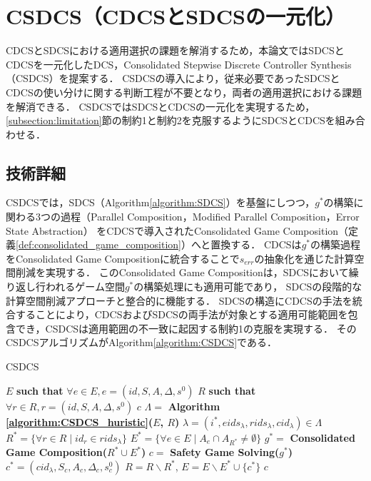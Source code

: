 \section{CSDCS（CDCSとSDCSの一元化）}
\label{section:proposal}
CDCSとSDCSにおける適用選択の課題を解消するため，本論文ではSDCSとCDCSを一元化したDCS，Consolidated Stepwise Discrete Controller Synthesis（CSDCS）を提案する．
CSDCSの導入により，従来必要であったSDCSとCDCSの使い分けに関する判断工程が不要となり，両者の適用選択における課題を解消できる．
CSDCSではSDCSとCDCSの一元化を実現するため，\ref{subsection:limitation}節の制約1と制約2を克服するようにSDCSとCDCSを組み合わせる．

\subsection{技術詳細}
CSDCSでは，SDCS（Algorithm\ref{algorithm:SDCS}）を基盤にしつつ，$g^{*}$の構築に関わる3つの過程（Parallel Composition，Modified Parallel Composition，Error State Abstraction）
をCDCSで導入されたConsolidated Game Composition（定義\ref{def:consolidated_game_composition}）へと置換する．
CDCSは$g^{*}$の構築過程をConsolidated Game Compositionに統合することで$s_{err}$の抽象化を通じた計算空間削減を実現する．
このConsolidated Game Compositionは，SDCSにおいて繰り返し行われるゲーム空間$g^{*}$の構築処理にも適用可能であり，
SDCSの段階的な計算空間削減アプローチと整合的に機能する．
SDCSの構造にCDCSの手法を統合することにより，CDCSおよびSDCSの両手法が対象とする適用可能範囲を包含でき，CSDCSは適用範囲の不一致に起因する制約1の克服を実現する．
そのCSDCSアルゴリズムがAlgorithm\ref{algorithm:CSDCS}である．

\begin{algorithm}[h]
\caption{CSDCS}
\label{algorithm:CSDCS}
\begin{algorithmic}[1]
\renewcommand{\algorithmicrequire}{\textbf{Input:}}
\renewcommand{\algorithmicensure}{\textbf{Output:}}
\REQUIRE $E$ {\bf such that} $\forall e \in E, e = (id, S, A, \Delta, s^0)$
\REQUIRE $R$ {\bf such that} $\forall r \in R, r = (id, S, A, \Delta, s^0)$
\ENSURE $c$
\STATE $\Lambda =$ {\bf Algorithm \ref{algorithm:CSDCS_huristic}($E$, $R$)}
    \STATE $\lambda = (i^*, eids_{\lambda}, rids_{\lambda}, cid_{\lambda}) \in \Lambda$
    \STATE $R^* = \{\forall r \in R \mid id_{r} \in rids_{\lambda}\}$
    \STATE $E^* = \{\forall e \in E \mid A_{e} \cap A_{R^*} \neq \emptyset\}$
    \STATE $g^* =$ {\bf Consolidated Game Composition($R^* \cup E^*$)}
    \STATE $c   =$ {\bf Safety Game Solving($g^*$)}
    \STATE $c^* = (cid_{\lambda}, S_{c}, A_{c}, \Delta_{c}, s^0_{c})$
    \STATE $R   = R \backslash R^*$, $E = E \backslash E^* \cup \{c^*\}$
\ENDFOR
{} $c$
\end{algorithmic}
\end{algorithm}

